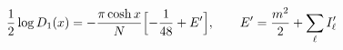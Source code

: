 \begin{equation}
\frac{1}{2}\log{D}_1(x)
=-\frac{\pi\cosh x}{N}\Bigl[
-\frac{1}{48}+E'\Bigr],\qquad E'=\frac{m^2}{2}+\sum_{\ell} I_\ell'
\end{equation}

